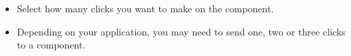 
\begin{itemize}
\item Select how many clicks you want to make on the component.
\item Depending on your application, you may need to send one, two or three clicks to a component. 
\end{itemize}
